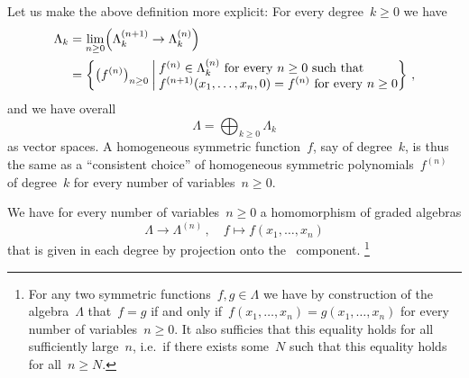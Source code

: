 \documentclass[a4paper,11pt]{scrartcl}
\begin{document}
Let us make the above definition more explicit:
For every degree~$k \geq 0$ we have
\begin{align*}
  \Lambda_k
  &=
  \lim_{n \geq 0}
  \Bigl( \Lambda^{(n+1)}_k \to \Lambda^{(n)}_k \Bigr)
  \\
  &=
  \left\{
    \bigl( f^{(n)} \bigr)_{n \geq 0}
    \suchthat*
    \begin{tabular}{@{}l@{}}
      $f^{(n)} \in \Lambda^{(n)}_k$ for every~$n \geq 0$ such that \\
      $f^{(n+1)}(x_1, \dotsc, x_n, 0) = f^{(n)}$ for every~$n \geq 0$
    \end{tabular}
  \right\} \,,
\end{align*}
and we have overall
\[
  \Lambda
  =
  \bigoplus_{k \geq 0} \Lambda_k
\]
as vector spaces.
A homogeneous symmetric function~$f$, say of degree~$k$, is thus the same as a \enquote{consistent choice} of homogeneous symmetric polynomials~$f^{(n)}$ of degree~$k$ for every number of variables~$n \geq 0$.

We have for every number of variables~$n \geq 0$ a homomorphism of graded algebras
\[
  \Lambda
  \to
  \Lambda^{(n)} \,,
  \quad
  f
  \mapsto
  f(x_1, \dotsc, x_n)
\]
that is given in each degree by projection onto the~ component.%
\footnote{%
  For any two symmetric functions~$f, g \in \Lambda$ we have by construction of the algebra~$\Lambda$ that~$f = g$ if and only if~$f(x_1, \dotsc, x_n) = g(x_1, \dotsc, x_n)$ for every number of variables~$n \geq 0$.
  It also sufficies that this equality holds for all sufficiently large~$n$, i.e.\ if there exists some~$N$ such that this equality holds for all~$n \geq N$.
}
\end{document}
